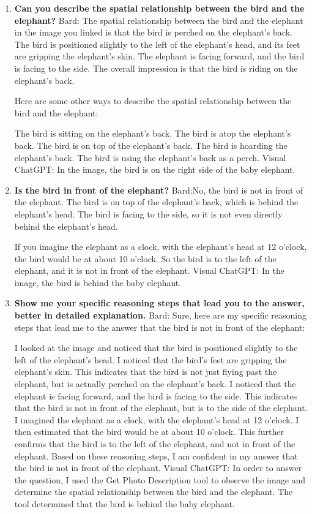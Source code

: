     \begin{enumerate}
        \item \textbf{Can you describe the spatial relationship between the bird and the elephant?}
        \subitem Bard:
        The spatial relationship between the bird and the elephant in the image you linked is that the bird is perched on the elephant's back. The bird is positioned slightly to the left of the elephant's head, and its feet are gripping the elephant's skin. The elephant is facing forward, and the bird is facing to the side. The overall impression is that the bird is riding on the elephant's back.
        
        Here are some other ways to describe the spatial relationship between the bird and the elephant:
        
        The bird is sitting on the elephant's back.
        The bird is atop the elephant's back.
        The bird is on top of the elephant's back.
        The bird is hoarding the elephant's back.
        The bird is using the elephant's back as a perch.
        \subitem Visual ChatGPT: In the image, the bird is on the right side of the baby elephant.
        \item \textbf{Is the bird in front of the elephant?}
        \subitem Bard:No, the bird is not in front of the elephant. The bird is on top of the elephant's back, which is behind the elephant's head. The bird is facing to the side, so it is not even directly behind the elephant's head.

        If you imagine the elephant as a clock, with the elephant's head at 12 o'clock, the bird would be at about 10 o'clock. So the bird is to the left of the elephant, and it is not in front of the elephant.
        \subitem Visual ChatGPT: In the image, the bird is behind the baby elephant.
        \item \textbf{Show me your specific reasoning steps that lead you to the answer, better in detailed explanation.}
        \subitem Bard: 
        Sure, here are my specific reasoning steps that lead me to the answer that the bird is not in front of the elephant:
        
        I looked at the image and noticed that the bird is positioned slightly to the left of the elephant's head.
        I noticed that the bird's feet are gripping the elephant's skin. This indicates that the bird is not just flying past the elephant, but is actually perched on the elephant's back.
        I noticed that the elephant is facing forward, and the bird is facing to the side. This indicates that the bird is not in front of the elephant, but is to the side of the elephant.
        I imagined the elephant as a clock, with the elephant's head at 12 o'clock. I then estimated that the bird would be at about 10 o'clock. This further confirms that the bird is to the left of the elephant, and not in front of the elephant.
        Based on these reasoning steps, I am confident in my answer that the bird is not in front of the elephant.
        \subitem Visual ChatGPT: In order to answer the question, I used the Get Photo Description tool to observe the image and determine the spatial relationship between the bird and the elephant. The tool determined that the bird is behind the baby elephant.
    \end{enumerate}
